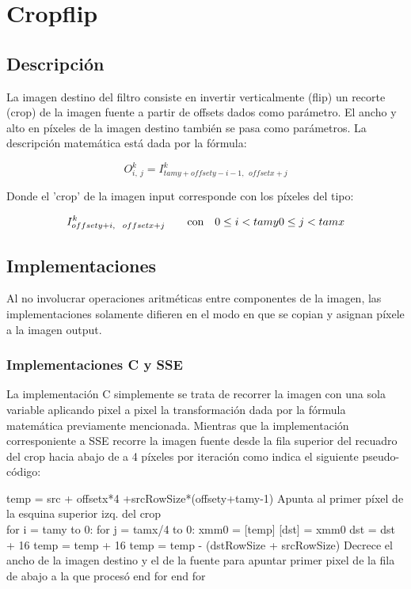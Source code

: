 \section{Cropflip}

\subsection{Descripción}
La imagen destino del filtro consiste en invertir verticalmente (flip) un recorte (crop) de la imagen fuente a partir de offsets dados como parámetro. El ancho y alto en píxeles de la imagen destino también se pasa como parámetros.
La descripción matemática está dada por la fórmula:

$$ O_{i,\ j}^{k}=I_{tamy+offsety-i-1, \ \ offsetx+j}^{k} $$

Donde el 'crop' de la imagen input corresponde con los píxeles del tipo:

$$
I_{offsety+i, \ \ offsetx+j}^{k} 
\qquad \text{con} \quad 0 \leq i < tamy \\ 0 \leq j < tamx 
$$

\subsection{Implementaciones}
Al no involucrar operaciones aritméticas entre componentes de la imagen, las implementaciones solamente difieren en el modo en que se copian y asignan píxele a la imagen output.
\subsubsection{Implementaciones C y SSE}
La implementación C simplemente se trata de recorrer la imagen con una sola variable aplicando pixel a pixel la transformación dada por la fórmula matemática previamente mencionada. Mientras que la implementación corresponiente a SSE recorre la imagen fuente desde la fila superior del recuadro del crop hacia abajo de a 4 píxeles por iteración como indica el siguiente pseudo-código: 

temp = src + offsetx*4 +srcRowSize*(offsety+tamy-1)       {Apunta al primer píxel de la esquina superior izq. del crop}\\ 
for i = tamy to 0: 
  for j = tamx/4 to 0: 
    xmm0 = [temp]
    [dst] = xmm0
    dst = dst  + 16
    temp =  temp + 16
  temp = temp - (dstRowSize + srcRowSize)       {Decrece el ancho de la imagen destino y el de la fuente para apuntar primer pixel de la fila de abajo a la que procesó}      
  end for
end for

